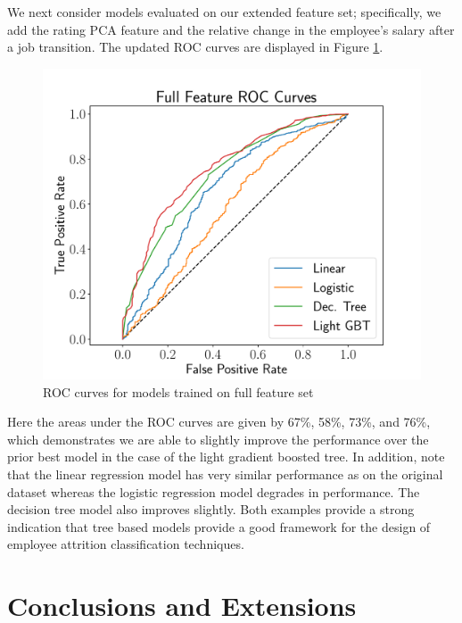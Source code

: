 \documentclass[10pt]{article}
\begin{document}
We next consider models evaluated on our extended feature set; specifically, we add the 
rating PCA feature and the relative change in the employee's salary after a job transition. 
The updated ROC curves are displayed in Figure \ref{fig:fullroc}.
%
\begin{figure}[thb]
    \centering
	\includegraphics[width=1.0\linewidth]{fullROC.pdf}
	\caption{ROC curves for models trained on full feature set}
	\label{fig:fullroc}
\end{figure}
%
Here the areas under the ROC curves are given by 67\%, 58\%, 73\%, and 76\%, which demonstrates 
we are able to slightly improve the performance over the prior best model in the case of the 
light gradient boosted tree.  In addition, note that the linear regression model has very similar 
performance as on the original dataset whereas the logistic regression model degrades in performance.  
The decision 
tree model also improves slightly.  Both examples provide a strong indication that tree based models 
provide a good framework for the design of employee attrition classification techniques. 

\section{Conclusions and Extensions} \label{consec}
\end{document}

